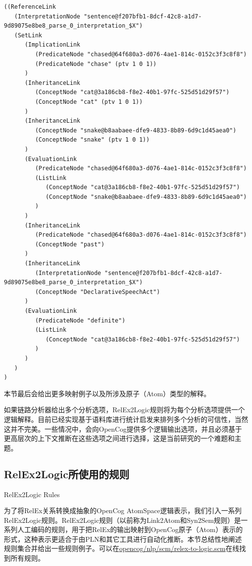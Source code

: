 {\tt\begin{small}\begin{lstlisting}
((ReferenceLink
   (InterpretationNode "sentence@f207bfb1-8dcf-42c8-a1d7-9d89075e8be8_parse_0_interpretation_$X")
   (SetLink
      (ImplicationLink
         (PredicateNode "chased@64f680a3-d076-4ae1-814c-0152c3f3c8f8")
         (PredicateNode "chase" (ptv 1 0 1))
      )
      (InheritanceLink
         (ConceptNode "cat@3a186cb8-f8e2-40b1-97fc-525d51d29f57")
         (ConceptNode "cat" (ptv 1 0 1))
      )
      (InheritanceLink
         (ConceptNode "snake@b8aabaee-dfe9-4833-8b89-6d9c1d45aea0")
         (ConceptNode "snake" (ptv 1 0 1))
      )
      (EvaluationLink
         (PredicateNode "chased@64f680a3-d076-4ae1-814c-0152c3f3c8f8")
         (ListLink
            (ConceptNode "cat@3a186cb8-f8e2-40b1-97fc-525d51d29f57")
            (ConceptNode "snake@b8aabaee-dfe9-4833-8b89-6d9c1d45aea0")
         )
      )
      (InheritanceLink
         (PredicateNode "chased@64f680a3-d076-4ae1-814c-0152c3f3c8f8")
         (ConceptNode "past")
      )
      (InheritanceLink
         (InterpretationNode "sentence@f207bfb1-8dcf-42c8-a1d7-9d89075e8be8_parse_0_interpretation_$X")
         (ConceptNode "DeclarativeSpeechAct")
      )
      (EvaluationLink
         (PredicateNode "definite")
         (ListLink
            (ConceptNode "cat@3a186cb8-f8e2-40b1-97fc-525d51d29f57")
         )
      )
   )
)
\end{lstlisting}\end{small}}

本节最后会给出更多映射例子以及所涉及原子（Atom）类型的解释。

如果链路分析器给出多个分析选项，RelEx2Logic规则将为每个分析选项提供一个逻辑解释。目前已经实现基于语料库进行统计启发来排列多个分析的可信性，当然这并不完美。一些情况中，会向OpenCog提供多个逻辑输出选项，并且必须基于更高层次的上下文推断在这些选项之间进行选择，这是当前研究的一个难题和主题。


\subsection{RelEx2Logic所使用的规则}{RelEx2Logic Rules}

为了将RelEx关系转换成抽象的OpenCog AtomSpace逻辑表示，我们引入一系列RelEx2Logic规则。RelEx2Logic规则（以前称为Link2Atom和Syn2Sem规则\cite{Lian2012}）是一系列人工编码的规则，用于把RelEx的输出映射到OpenCog原子（Atom）表示的形式，这种表示更适合于由PLN和其它工具进行自动化推断。本节总结性地阐述规则集合并给出一些规则例子。可以在\url{opencog/nlp/scm/relex-to-logic.scm}在线找到所有规则。

